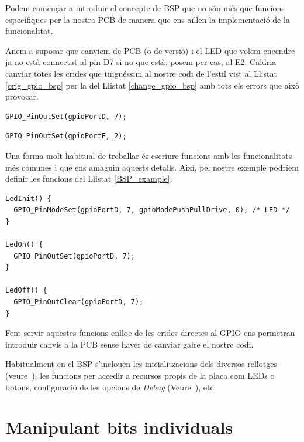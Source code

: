 Podem començar a introduir el concepte de \gls{BSP} que no són més que funcions específiques per la nostra PCB de manera que ens aïllen la implementació de la funcionalitat.

Anem a suposar que canviem de PCB (o de versió) i el LED que volem encendre ja no està connectat al pin D7 si no que està, posem per cas, al E2. Caldria canviar totes les crides que tinguéssim al nostre codi de l'estil vist al Llistat \ref{orig_gpio_bsp} per la del Llistat \ref{change_gpio_bsp} amb tots els errors que això provocar.

\begin{lstlisting}[style=customc, caption=Codi de configuració d'un pin, label=orig_gpio_bsp]
GPIO_PinOutSet(gpioPortD, 7);
\end{lstlisting}

\begin{lstlisting}[style=customc, label=change_gpio_bsp, caption=Codi amb la nova configuració del pin]
GPIO_PinOutSet(gpioPortE, 2);
\end{lstlisting}

Una forma molt habitual de treballar és escriure funcions amb les funcionalitats més comunes i que ens amaguin aquests detalls. Així, pel nostre exemple podríem definir les funcions del Llistat \ref{BSP_example}.
\begin{lstlisting}[style=customc, label=BSP_example, caption=Exemple de BSP senzill]
LedInit() {
  GPIO_PinModeSet(gpioPortD, 7, gpioModePushPullDrive, 0); /* LED */
}

LedOn() {
  GPIO_PinOutSet(gpioPortD, 7);
}

LedOff() {
  GPIO_PinOutClear(gpioPortD, 7);
}
\end{lstlisting}

Fent servir aquestes funcions enlloc de les crides directes al GPIO ens permetran introduir canvis a la PCB sense haver de canviar gaire el nostre codi.

Habitualment en el BSP s'inclouen les inicialitzacions dels diversos rellotges (veure~{}), les funcions per accedir a recursos propis de la placa com LEDs o botons, configuració de les opcions de {\em Debug} (Veure~{}), etc.

\section{Manipulant bits individuals}
\label{sec:bits}

